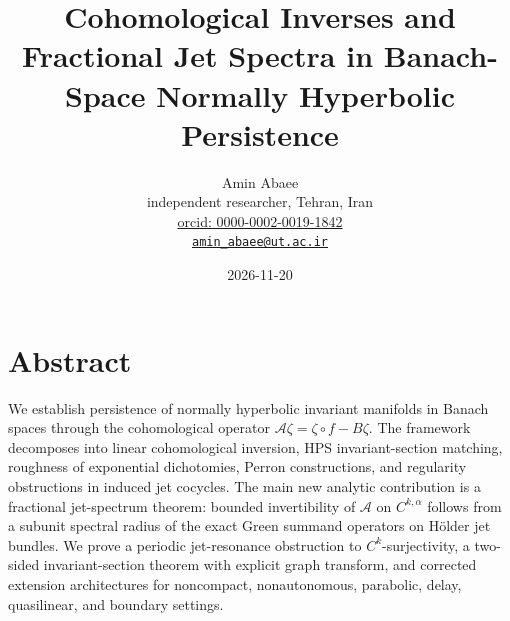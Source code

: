 \documentclass[11pt,a4paper]{article}
\title{Cohomological Inverses and Fractional Jet Spectra in Banach-Space Normally Hyperbolic Persistence}
\author{Amin Abaee \\ independent researcher, Tehran, Iran \\ \href{https://orcid.org/0000-0002-0019-1842}{orcid: 0000-0002-0019-1842} \\ \href{mailto:amin_abaee@ut.ac.ir}{\texttt{amin\_abaee@ut.ac.ir}}}
\date{2026-11-20}
\theoremstyle{plain}
\theoremstyle{definition}
\theoremstyle{remark}
\numberwithin{equation}{section}
\numberwithin{figure}{section}
\begin{document}
\maketitle

\section*{Abstract}

We establish persistence of normally hyperbolic invariant manifolds in Banach spaces through the cohomological operator $\mathcal A\zeta=\zeta\circ f-B\zeta$. The framework decomposes into linear cohomological inversion, HPS invariant-section matching, roughness of exponential dichotomies, Perron constructions, and regularity obstructions in induced jet cocycles. The main new analytic contribution is a fractional jet-spectrum theorem: bounded invertibility of $\mathcal A$ on $C^{k,\alpha}$ follows from a subunit spectral radius of the exact Green summand operators on Hölder jet bundles. We prove a periodic jet-resonance obstruction to $C^k$-surjectivity, a two-sided invariant-section theorem with explicit graph transform, and corrected extension architectures for noncompact, nonautonomous, parabolic, delay, quasilinear, and boundary settings.

\begin{center}
\end{center}
\end{document}

